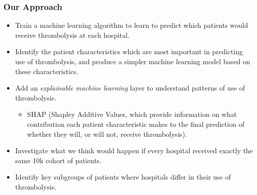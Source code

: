 \begin{frame}
\frametitle{Our Approach}

\small

\begin{itemize}
    \item Train a machine learning algorithm to learn to predict which patients would receive thrombolysis at each hospital.
    \item Identify the patient characteristics which are most important in predicting use of thrombolysis, and produce a simpler machine learning model based on these characteristics.
    \item Add an \emph{explainable machine learning} layer to understand patterns of use of thrombolysis.
    \begin{itemize}
        \footnotesize
        \item SHAP (Shapley Additive Values, which provide information on what contribution each patient characteristic makes to the final prediction of whether they will, or will not, receive thrombolysis).
    \end{itemize}
    \item Investigate what we think would happen if every hospital received exactly the same 10k cohort of patients.
    \item Identify key subgroups of patients where hospitals differ in their use of thrombolysis.
\end{itemize}

\vspace{3mm}

\end{frame}